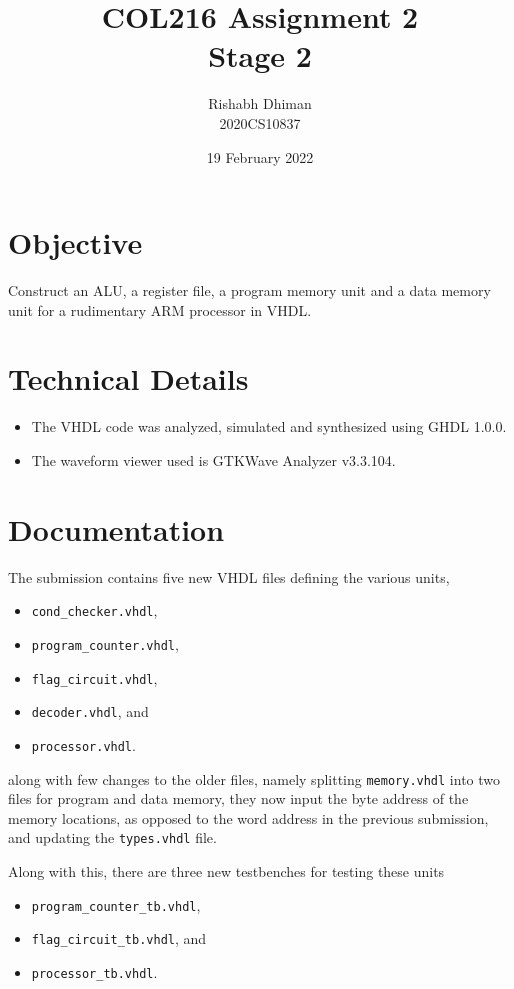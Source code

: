 \documentclass[a4paper]{scrartcl}
\title{COL216 Assignment 2\\{\Large Stage 2}}
\date{19 February 2022}
\author{Rishabh Dhiman\\ 2020CS10837}
\renewcommand{\tt}{\texttt}
\begin{document}
\maketitle

\section{Objective}
Construct an ALU, a register file, a program memory unit and a data memory unit for a rudimentary ARM processor in VHDL.

\section{Technical Details}
\begin{itemize}
	\item The VHDL code was analyzed, simulated and synthesized using GHDL 1.0.0.
	\item The waveform viewer used is GTKWave Analyzer v3.3.104.
\end{itemize}

\section{Documentation}
The submission contains five new VHDL files defining the various units,
\begin{multicols}{2}
	\begin{itemize}
		\item \tt{cond_checker.vhdl},
		\item \tt{program_counter.vhdl},
		\item \tt{flag_circuit.vhdl},
		\item \tt{decoder.vhdl}, and
		\item \tt{processor.vhdl}.
	\end{itemize}
\end{multicols}
along with few changes to the older files, namely splitting \tt{memory.vhdl} into two files for program and data memory, they now input the byte address of the memory locations, as opposed to the word address in the previous submission, and updating the \tt{types.vhdl} file.

Along with this, there are three new testbenches for testing these units
\begin{multicols}{2}
	\begin{itemize}
		\item \tt{program_counter_tb.vhdl},
		\item \tt{flag_circuit_tb.vhdl}, and
		\item \tt{processor_tb.vhdl}.
	\end{itemize}
\end{multicols}
\end{document}
